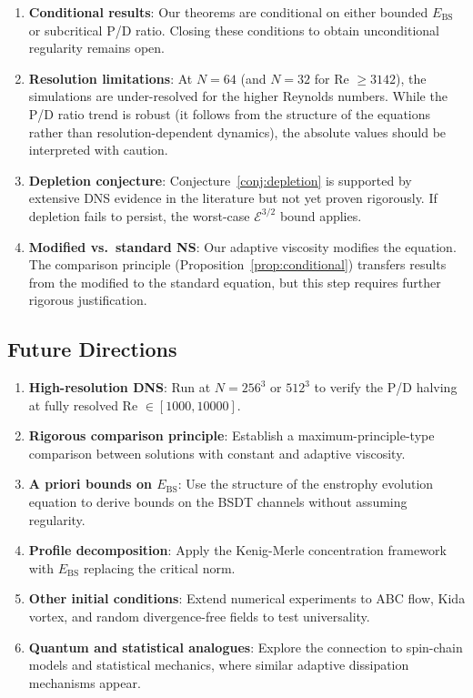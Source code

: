 \documentclass[12pt, a4paper]{article}
\newcommand{\Ebs}{E_{\mathrm{BS}}}
\begin{document}
\begin{enumerate}
\item \textbf{Conditional results}: Our theorems are conditional on
  either bounded $\Ebs$ or subcritical P/D ratio. Closing these
  conditions to obtain unconditional regularity remains open.

\item \textbf{Resolution limitations}: At $N = 64$ (and $N = 32$
  for Re $\geq 3142$), the simulations are under-resolved for the
  higher Reynolds numbers. While the P/D ratio trend is robust
  (it follows from the structure of the equations rather than
  resolution-dependent dynamics), the absolute values should be
  interpreted with caution.

\item \textbf{Depletion conjecture}: Conjecture~\ref{conj:depletion}
  is supported by extensive DNS evidence in the literature but
  not yet proven rigorously. If depletion fails to persist,
  the worst-case $\mathcal{E}^{3/2}$ bound applies.

\item \textbf{Modified vs.\ standard NS}: Our adaptive viscosity
  modifies the equation. The comparison principle (Proposition~\ref{prop:conditional})
  transfers results from the modified to the standard equation,
  but this step requires further rigorous justification.
\end{enumerate}

\subsection{Future Directions}

\begin{enumerate}
\item \textbf{High-resolution DNS}: Run at $N = 256^3$ or $512^3$
  to verify the P/D halving at fully resolved Re $\in [1000, 10000]$.

\item \textbf{Rigorous comparison principle}: Establish a maximum-principle-type
  comparison between solutions with constant and adaptive viscosity.

\item \textbf{A priori bounds on $\Ebs$}: Use the structure of the
  enstrophy evolution equation to derive bounds on the BSDT channels
  without assuming regularity.

\item \textbf{Profile decomposition}: Apply the Kenig-Merle concentration
  framework with $\Ebs$ replacing the critical norm.

\item \textbf{Other initial conditions}: Extend numerical experiments
  to ABC flow, Kida vortex, and random divergence-free fields
  to test universality.

\item \textbf{Quantum and statistical analogues}: Explore the
  connection to spin-chain models and statistical mechanics,
  where similar adaptive dissipation mechanisms appear.
\end{enumerate}
\end{document}
